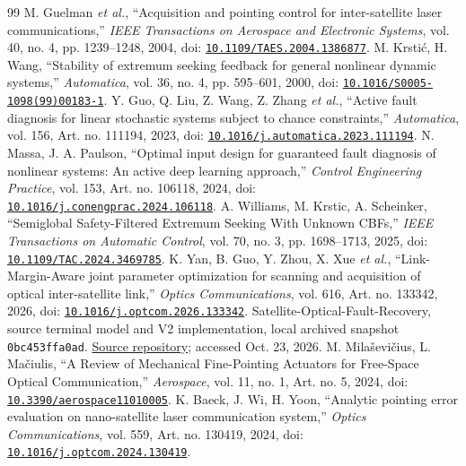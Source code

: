 \begin{thebibliography}{99}
 M. Guelman \emph{et al.}, ``Acquisition and pointing control for inter-satellite laser communications,'' \emph{IEEE Transactions on Aerospace and Electronic Systems}, vol. 40, no. 4, pp. 1239--1248, 2004, doi: \href{https://doi.org/10.1109/TAES.2004.1386877}{\nolinkurl{10.1109/TAES.2004.1386877}}.
 M. Krstić, H. Wang, ``Stability of extremum seeking feedback for general nonlinear dynamic systems,'' \emph{Automatica}, vol. 36, no. 4, pp. 595--601, 2000, doi: \href{https://doi.org/10.1016/S0005-1098(99)00183-1}{\nolinkurl{10.1016/S0005-1098(99)00183-1}}.
 Y. Guo, Q. Liu, Z. Wang, Z. Zhang \emph{et al.}, ``Active fault diagnosis for linear stochastic systems subject to chance constraints,'' \emph{Automatica}, vol. 156, Art. no. 111194, 2023, doi: \href{https://doi.org/10.1016/j.automatica.2023.111194}{\nolinkurl{10.1016/j.automatica.2023.111194}}.
 N. Massa, J. A. Paulson, ``Optimal input design for guaranteed fault diagnosis of nonlinear systems: An active deep learning approach,'' \emph{Control Engineering Practice}, vol. 153, Art. no. 106118, 2024, doi: \href{https://doi.org/10.1016/j.conengprac.2024.106118}{\nolinkurl{10.1016/j.conengprac.2024.106118}}.
 A. Williams, M. Krstic, A. Scheinker, ``Semiglobal Safety-Filtered Extremum Seeking With Unknown CBFs,'' \emph{IEEE Transactions on Automatic Control}, vol. 70, no. 3, pp. 1698--1713, 2025, doi: \href{https://doi.org/10.1109/TAC.2024.3469785}{\nolinkurl{10.1109/TAC.2024.3469785}}.
 K. Yan, B. Guo, Y. Zhou, X. Xue \emph{et al.}, ``Link-Margin-Aware joint parameter optimization for scanning and acquisition of optical inter-satellite link,'' \emph{Optics Communications}, vol. 616, Art. no. 133342, 2026, doi: \href{https://doi.org/10.1016/j.optcom.2026.133342}{\nolinkurl{10.1016/j.optcom.2026.133342}}.
 Satellite-Optical-Fault-Recovery, source terminal model and V2 implementation, local archived snapshot \texttt{0bc453ffa0ad}. \href{https://github.com/kaushalrog/Satellite-Optical-Fault-Recovery}{Source repository}; accessed Oct. 23, 2026.
 M. Milaševičius, L. Mačiulis, ``A Review of Mechanical Fine-Pointing Actuators for Free-Space Optical Communication,'' \emph{Aerospace}, vol. 11, no. 1, Art. no. 5, 2024, doi: \href{https://doi.org/10.3390/aerospace11010005}{\nolinkurl{10.3390/aerospace11010005}}.
 K. Baeck, J. Wi, H. Yoon, ``Analytic pointing error evaluation on nano-satellite laser communication system,'' \emph{Optics Communications}, vol. 559, Art. no. 130419, 2024, doi: \href{https://doi.org/10.1016/j.optcom.2024.130419}{\nolinkurl{10.1016/j.optcom.2024.130419}}.

\end{thebibliography}
